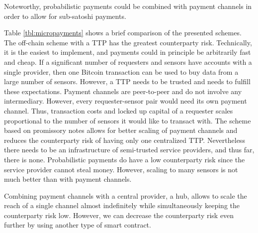 Noteworthy, probabilistic payments could be combined with payment channels in order to allow for sub-satoshi payments.

\begin{table}
\caption{Comparison of Bitcoin micropayment schemes.}
\label{tbl:micropayments}
\end{table}

Table \ref{tbl:micropayments} shows a brief comparison of the presented schemes. The off-chain scheme with a \ac{TTP} has the greatest counterparty risk. Technically, it is the easiest to implement, and payments could in principle be arbitrarily fast and cheap. If a significant number of requesters and sensors have accounts with a single provider, then one Bitcoin transaction can be used to buy data from a large number of sensors. However, a \ac{TTP} needs to be trusted and needs to fulfill these expectations. Payment channels are peer-to-peer and do not involve any intermediary. However, every requester-sensor pair would need its own payment channel. Thus, transaction costs and locked up capital of a requester scales proportional to the number of sensors it would like to transact with. The scheme based on promissory notes allows for better scaling of payment channels and reduces the counterparty risk of having only one centralized \ac{TTP}. Nevertheless there needs to be an infrastructure of semi-trusted service providers, and thus far, there is none. Probabilistic payments do have a low counterparty risk since the service provider cannot steal money. However, scaling to many sensors is not much better than with payment channels.

Combining payment channels with a central provider, a hub, allows to scale the reach of a single channel almost indefinitely while simultaneously keeping the counterparty risk low. However, we can decrease the counterparty risk even further by using another type of smart contract.

